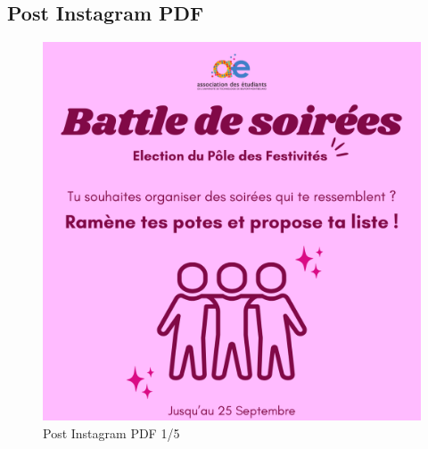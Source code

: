 \newpage

\subsection*{Post Instagram \gls{PDF}}\label{subsec:post-insta-pdf}

\begin{figure}[!h]
    \begin{center}
        \includegraphics[scale=0.2]{ressources/post pdf/PDF}
        \caption{Post Instagram \gls{PDF} 1/5 \label{fig:pdf1}}
    \end{center}
\end{figure}

